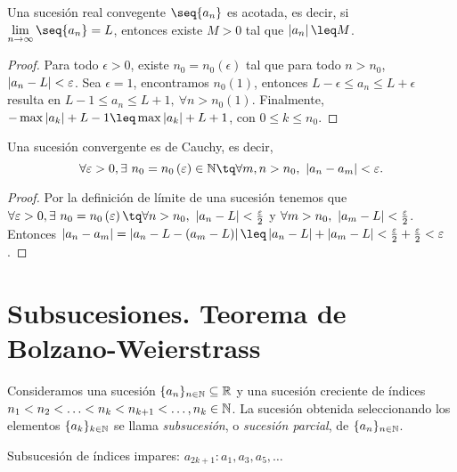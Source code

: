\begin{lemma}
    Una sucesión real convegente $\seq{a_n}$ es acotada, es decir, si $\lim_{n\to\infty}\seq{a_n} = L$, entonces existe $M > 0$ tal que $\abs{a_n}\leq M$.
\end{lemma}

\begin{proof}
    Para todo $\epsilon > 0$, existe $n_0 = n_0\left( \epsilon \right) $ tal que para todo $n > n_0$, $\left\vert a_n - L \right\vert < \varepsilon$. Sea $\epsilon = 1$, encontramos $n_0\left( 1 \right) $, entonces $L - \epsilon \leq a_n\leq L + \epsilon$ resulta en $L - 1\leq a_n \leq L + 1,\ \forall n>n_0\left( 1 \right) $. Finalmente, $-\max\abs{a_k} + L - 1\leq \max\abs{a_k} + L + 1$, con $0\leq k\leq n_0$.
\end{proof}

\begin{lemma}
    Una sucesión convergente es de Cauchy, es decir,
    \begin{equation}
        \forall\epsilon > 0, \exists\ n_0 = n_0\left( \epsilon \right) \in\N\tq \forall m, n > n_0,\ \abs{a_n - a_m} < \epsilon.
    \end{equation}
\end{lemma}

\begin{proof}
    Por la definición de límite de una sucesión tenemos que $\forall \epsilon > 0, \exists\ n_0 = n_0\left( \epsilon \right) \tq \forall n > n_0,\ \abs{a_n - L} < \frac{\epsilon}{2}$ y $\forall m > n_0,\ \left\vert a_m - L \right\vert < \frac{\varepsilon}{2}$. Entonces $\abs{a_n - a_m} = \abs{a_n - L - \left( a_m - L \right) }\leq \abs{a_n - L} + \abs{a_m - L} < \frac{\epsilon}{2} + \frac{\epsilon}{2} < \epsilon$.
\end{proof}

\section{Subsucesiones. Teorema de Bolzano-Weierstrass}
\begin{defi}[Subsucesión]
    Consideramos una sucesión $\{a_n\}_{n\in\mathbb{N}}\subseteq\mathbb{R} $ y una sucesión creciente
    de índices $n_1 < n_2 < \ldots < n_k < n_{k+1} < \ldots, n_k\in\mathbb{N}$. La sucesión obtenida seleccionando
    los elementos $\{a_k\}_{k\in\mathbb{N}} $ se llama \textit{subsucesión}, o \textit{sucesión parcial}, de
    $\{a_n\}_{n\in\mathbb{N}} $.
\end{defi}

\begin{example}
    Subsucesión de índices impares: $a_{2k + 1}: a_1, a_3, a_5, \ldots$
\end{example}

